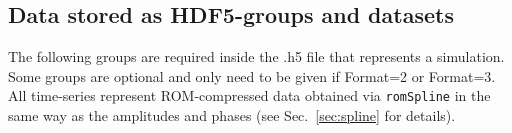 \documentclass[11pt,tightenlines,article,amssymb,amsmath,amsfonts,superscriptaddress,nofootinbib]{revtex4}
\begin{document}
%

\subsection{Data stored as HDF5-groups and datasets}
\label{sec:format:groups}
The following groups are required inside the .h5 file that represents
a simulation.
Some groups are optional and only need to be given if Format=2 or Format=3.
All time-series represent ROM-compressed data obtained via
\texttt{romSpline} in the same way as the amplitudes and phases (see
Sec.~\ref{sec:spline} for details). \\
\end{document}
